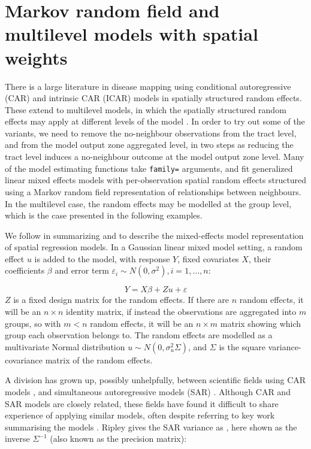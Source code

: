 \documentclass[]{book}
\begin{document}
\hypertarget{markov-random-field-and-multilevel-models-with-spatial-weights}{%
\section{Markov random field and multilevel models with spatial weights}\label{markov-random-field-and-multilevel-models-with-spatial-weights}}

There is a large literature in disease mapping using conditional autoregressive (CAR) and intrinsic CAR (ICAR) models in spatially structured random effects. These extend to multilevel models, in which the spatially structured random effects may apply at different levels of the model \citep{bivandetal17a}. In order to try out some of the variants, we need to remove the no-neighbour observations from the tract level, and from the model output zone aggregated level, in two steps as reducing the tract level induces a no-neighbour outcome at the model output zone level. Many of the model estimating functions take \texttt{family=} arguments, and fit generalized linear mixed effects models with per-observation spatial random effects structured using a Markov random field representation of relationships between neighbours. In the multilevel case, the random effects may be modelled at the group level, which is the case presented in the following examples.

We follow \citet{vgr_clubuc3m:19} in summarizing \citet{R:Pinheiro+Bates:2000} and \citet{mcculloch+searle:2001} to describe the mixed-effects model representation of spatial regression models. In a Gaussian linear mixed model setting, a random effect \(u\) is added to the model, with response \(Y\), fixed covariates \(X\), their coefficients \(\beta\) and error term \(\varepsilon_i \sim N(0, \sigma^2), i=1,\dots, n\):

\[
Y = X \beta + Z u + \varepsilon
\]
\(Z\) is a fixed design matrix for the random effects. If there are \(n\) random effects, it will be an \(n \times n\) identity matrix, if instead the observations are aggregated into \(m\) groups, so with \(m < n\) random effects, it will be an \(n \times m\) matrix showing which group each observation belongs to. The random effects are modelled as a multivariate Normal distribution \(u \sim N(0, \sigma^2_u \Sigma)\), and \(\Sigma\) is the square variance-covariance matrix of the random effects.

A division has grown up, possibly unhelpfully, between scientific fields using CAR models \citep{besag:74}, and simultaneous autoregressive models (SAR) \citep{ord:75, hepple:76}. Although CAR and SAR models are closely related, these fields have found it difficult to share experience of applying similar models, often despite referring to key work summarising the models \citep{ripley:81, ripley:88, Cressie:1993}. Ripley gives the SAR variance as \citeyearpar[page 89]{ripley:81}, here shown as the inverse \(\Sigma^{-1}\) (also known as the precision matrix):
\end{document}
